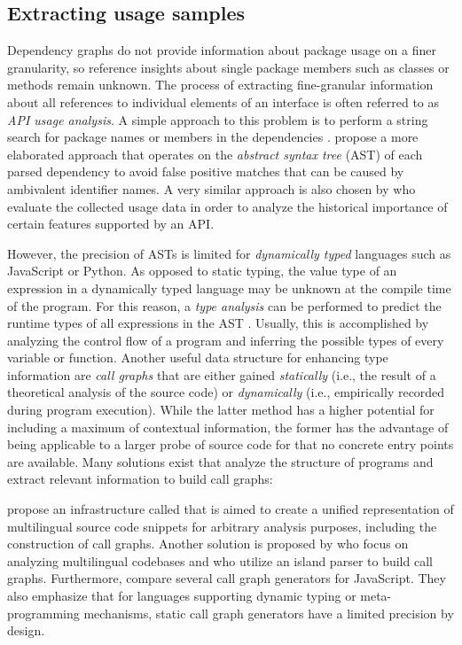 \subsection{Extracting usage samples}
\label{sec:related_work/usage_samples}

Dependency graphs do not provide information about package usage on a finer granularity, so reference insights about single package members such as classes or methods remain unknown.
The process of extracting fine-granular information about all references to individual elements of an interface is often referred to as \emph{API usage analysis}.
A simple approach to this problem is to perform a string search for package names or members in the dependencies \citep{mileva2010mining}.
\citet{qiu2016understanding} propose a more elaborated approach that operates on the \emph{abstract syntax tree} (AST) of each parsed dependency to avoid false positive matches that can be caused by ambivalent identifier names.
A very similar approach is also chosen by \citet{sawant2017fine} who evaluate the collected usage data in order to analyze the historical importance of certain features supported by an API.

However, the precision of ASTs is limited for \emph{dynamically typed} languages such as JavaScript or Python.
As opposed to static typing, the value type of an expression in a dynamically typed language may be unknown at the compile time of the program.
For this reason, a \emph{type analysis} can be performed to predict the runtime types of all expressions in the AST \citep{jensen2009type}.
Usually, this is accomplished by analyzing the control flow of a program and inferring the possible types of every variable or function.
Another useful data structure for enhancing type information are \emph{call graphs} that are either gained \emph{statically} (i.e., the result of a theoretical analysis of the source code) or \emph{dynamically} (i.e., empirically recorded during program execution).
While the latter method has a higher potential for including a maximum of contextual information, the former has the advantage of being applicable to a larger probe of source code for that no concrete entry points are available.
Many solutions exist that analyze the structure of programs and extract relevant information to build call graphs:

\citet{collard2013srcml} propose an infrastructure called  that is aimed to create a unified representation of multilingual source code snippets for arbitrary analysis purposes, including the construction of call graphs.
Another solution is proposed by \citet{bogar2018lightweight} who focus on analyzing multilingual codebases and who utilize an island parser to build call graphs.
Furthermore, \citet{antal2018static} compare several call graph generators for JavaScript.
They also emphasize that for languages supporting dynamic typing or meta-programming mechanisms, static call graph generators have a limited precision by design.

